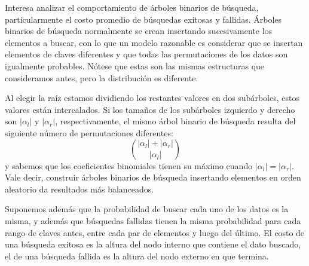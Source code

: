   Interesa analizar el comportamiento de árboles binarios de búsqueda,%
  particularmente el costo promedio de búsquedas exitosas y fallidas.
  Árboles binarios de búsqueda
  normalmente se crean insertando sucesivamente los elementos a buscar,
  con lo que un modelo razonable
  es considerar que se insertan elementos de claves diferentes
  y que todas las permutaciones de los datos
  son igualmente probables.
  Nótese que estas son las mismas estructuras que consideramos antes,
  pero la distribución es diferente.

  Al elegir la raíz
  estamos dividiendo los restantes valores en dos subárboles,
  estos valores están intercalados.
  Si los tamaños de los subárboles izquierdo y derecho
  son \(\lvert \alpha_l \rvert\) y \(\lvert \alpha_r \rvert\),
  respectivamente,
  el mismo árbol binario de búsqueda
  resulta del siguiente número de permutaciones diferentes:
  \begin{equation*}
    \binom{\lvert \alpha_l \rvert + \lvert \alpha_r \rvert}
	  {\lvert \alpha_l \rvert}
  \end{equation*}
  y sabemos que los coeficientes binomiales%
  tienen su máximo cuando \(\lvert \alpha_l \rvert = \lvert \alpha_r \rvert\).
  Vale decir,
  construir árboles binarios de búsqueda insertando elementos
  en orden aleatorio da resultados más balanceados.

  Suponemos además que la probabilidad de buscar cada uno de los datos
  es la misma,
  y además que búsquedas fallidas tienen la misma probabilidad
  para cada rango de claves
  antes,
  entre cada par de elementos
  y luego del último.
  El costo de una búsqueda exitosa es la altura del nodo interno
  que contiene el dato buscado,
  el de una búsqueda fallida es la altura del nodo externo
  en que termina.

